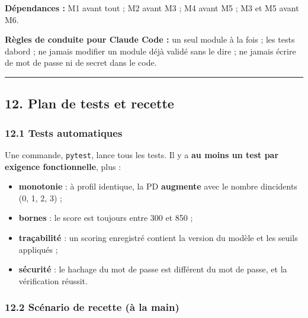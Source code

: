 \documentclass[
  french,
  11pt,
  a4paper,
]{article}
\providecommand{\tightlist}{%
  \setlength{\itemsep}{0pt}\setlength{\parskip}{0pt}}
\begin{document}
\textbf{Dépendances :} M1 avant tout ; M2 avant M3 ; M4 avant M5 ; M3 et
M5 avant M6.

\textbf{Règles de conduite pour Claude Code :} un seul module à la fois
; les tests d\textquotesingle abord ; ne jamais modifier un module déjà
validé sans le dire ; ne jamais écrire de mot de passe ni de secret dans
le code.

\begin{center}\rule{0.5\linewidth}{0.5pt}\end{center}

\subsection{12. Plan de tests et
recette}\label{12-plan-de-tests-et-recette}

\subsubsection{12.1 Tests automatiques}\label{121-tests-automatiques}

Une commande, \texttt{pytest}, lance tous les tests. Il y a \textbf{au
moins un test par exigence fonctionnelle}, plus :

\begin{itemize}
\tightlist
\item
  \textbf{monotonie} : à profil identique, la PD \textbf{augmente} avec
  le nombre d\textquotesingle incidents (0, 1, 2, 3) ;
\item
  \textbf{bornes} : le score est toujours entre 300 et 850 ;
\item
  \textbf{traçabilité} : un scoring enregistré contient la version du
  modèle et les seuils appliqués ;
\item
  \textbf{sécurité} : le hachage du mot de passe est différent du mot de
  passe, et la vérification réussit.
\end{itemize}

\subsubsection{12.2 Scénario de recette (à la
main)}\label{122-scuxe9nario-de-recette-uxe0-la-main}
\end{document}
